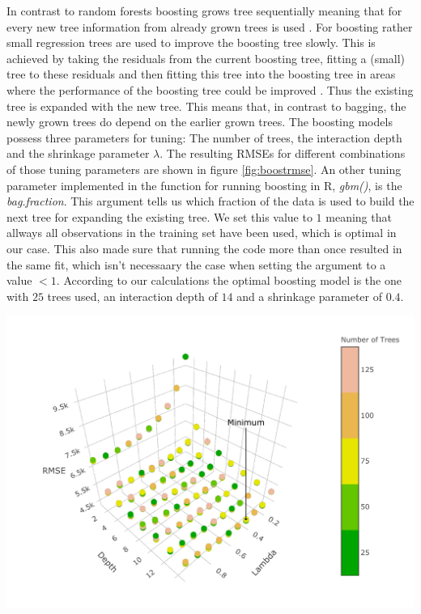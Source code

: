 \documentclass[11pt,]{article}
\let\origfigure\figure
\let\endorigfigure\endfigure
\renewenvironment{figure}[1][2] {
    \expandafter\origfigure\expandafter[H]
} {
    \endorigfigure
}
\begin{document}
In contrast to random forests boosting grows tree sequentially meaning
that for every new tree information from already grown trees is used
\autocite[cf.][p. 322]{James2014}. For boosting rather small regression
trees are used to improve the boosting tree slowly. This is achieved by
taking the residuals from the current boosting tree, fitting a (small)
tree to these residuals and then fitting this tree into the boosting
tree in areas where the performance of the boosting tree could be
improved \autocite[cf.][p. 322]{James2014}. Thus the existing tree is
expanded with the new tree. This means that, in contrast to bagging, the
newly grown trees do depend on the earlier grown trees. The boosting
models possess three parameters for tuning: The number of trees, the
interaction depth and the shrinkage parameter \(\lambda\). The resulting
\ac{RMSE}s for different combinations of those tuning parameters are
shown in figure \ref{fig:boostrmse}. An other tuning parameter
implemented in the function for running boosting in R, \emph{gbm()}, is
the \emph{bag.fraction}. This argument tells us which fraction of the
data is used to build the next tree for expanding the existing tree. We
set this value to \(1\) meaning that allways all observations in the
training set have been used, which is optimal in our case. This also
made sure that running the code more than once resulted in the same fit,
which isn't necessaary the case when setting the argument to a value
\(< 1\). According to our calculations the optimal boosting model is the
one with \(25\) trees used, an interaction depth of \(14\) and a
shrinkage parameter of \(0.4\).

\begin{figure}

{\centering \includegraphics{../00_data/output_paper/11_boosting_plot}

}

\caption[RMSEs of the Boosting Model for Different Parameters]{\label{fig:boostrmse}Boosting: Dependency between RMSE, Lambda, the Depths and the Number of Trees that are Grown.}\label{fig:boosting_hyper}
\end{figure}
\end{document}

